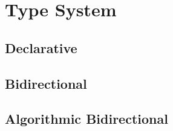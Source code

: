 \section{Type System}

\subsection{Declarative}

\subsection{Bidirectional}

\subsection{Algorithmic Bidirectional}
